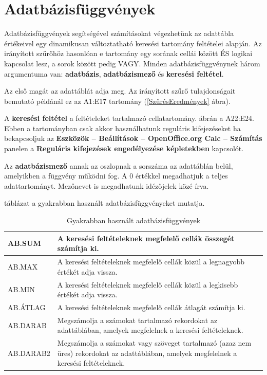 \chapter{Adatbázisfüggvények}
\thispagestyle{empty}

Adatbázisfüggvények segítségével számításokat
végezhetünk az adattábla értékeivel egy dinamikusan
változtatható keresési tartomány feltételei alapján. Az
irányított szűrőhöz hasonlóan e tartomány egy
sorának cellái között ÉS logikai kapcsolat lesz, a sorok
között pedig VAGY. Minden adatbázisfüggvénynek három
argumentuma van: \textbf{adatbázis}, \textbf{adatbázismező}
és \textbf{keresési feltétel}.

Az első magát az adattáblát adja meg. Az irányított
szűrő tulajdonságait bemutató példánál ez az A1:E17
tartomány (\ref{SzűrésEredmények} ábra).

A \textbf{keresési feltétel} a feltételeket tartalmazó
cellatartomány.  ábrán a A22:E24.
Ebben a tartományban csak akkor használhatunk reguláris
kifejezéseket ha bekapcsoljuk az
\textbf{Eszközök --  Beállítások --  OpenOffice.org Calc --
Számítás} panelen a \textbf{Reguláris kifejezések
engedélyezése képletekben} kapcsolót.

Az \textbf{adatbázismező} annak az oszlopnak a sorszáma az
adattáblán belül, amelyikben a függvény működni fog. A 0
értékkel megadhatjuk a teljes adattartományt. Mezőnevet is
megadhatunk idézőjelek közé írva.


 táblázat a gyakrabban használt
adatbázisfüggvényeket mutatja.

\begin{table}[!h]
\begin{center}
\caption{Gyakrabban használt adatbázisfüggvények}\label{AdatbázisFüggvények}
\begin{tabular}{|m{2.5cm}|m{8cm}|}
\hline
AB.SUM &
A keresési feltételeknek megfelelő cellák összegét
számítja ki.\\ \hline
AB.MAX &
A keresési feltételeknek megfelelő cellák közül a
legnagyobb értékét adja vissza.\\ \hline
AB.MIN &
A keresési feltételeknek megfelelő cellák közül a
legkisebb értékét adja vissza.\\ \hline
AB.ÁTLAG &
A keresési feltételeknek megfelelő cellák átlagát
számítja ki.\\ \hline
AB.DARAB &
Megszámolja a számokat tartalmazó rekordokat az adattáblában,
amelyek megfelelnek a keresési feltételeknek.\\ \hline
AB.DARAB2 &
Megszámolja a számokat vagy szöveget tartalmazó (azaz nem üres) 
rekordokat az adattáblában, amelyek megfelelnek a keresési
feltételeknek.\\ \hline
\end{tabular}
\end{center}
\end{table}

